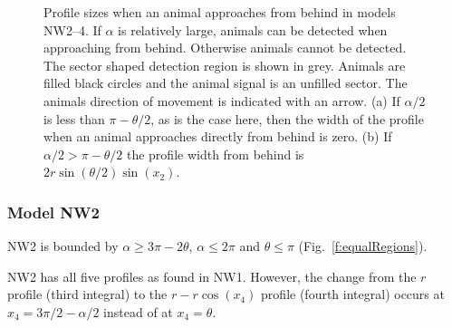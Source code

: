 \begin{figure}[t]
  \centering
{
}
\caption[Profile sizes when an animal approaches from behind in models NW2--4]{
Profile sizes when an animal approaches from behind in models NW2--4. 
If $\alpha$ is relatively large, animals can be detected when approaching from behind. 
Otherwise animals cannot be detected.  
The sector shaped detection region is shown in grey. 
Animals are filled black circles and the animal signal is an unfilled sector. 
The animals direction of movement is indicated with an arrow.  
(a) If $\alpha/2$ is less than $\pi - \theta/2$, as is the case here, then the width of the profile when an animal approaches directly from behind is zero. 
(b) If $\alpha/2 > \pi - \theta/2$ the profile width from behind is $2r\sin\left(\theta/2\right)\sin(x_2)$.
}
\label{f:NW2--4}
\end{figure}


\subsubsection{Model NW2} \label{NW2}

NW2 is bounded by $\alpha \ge 3\pi - 2\theta$, $\alpha \le 2\pi$ and $\theta\le\pi$ (Fig.~\ref{f:equalRegions}).

NW2 has all five profiles as found in NW1. However, the change from the $r$ profile (third integral) to the $r - r\cos(x_4)$ profile (fourth integral) occurs at $x_4 = 3\pi/2 - \alpha/2$ instead of at $x_4 = \theta$. 




